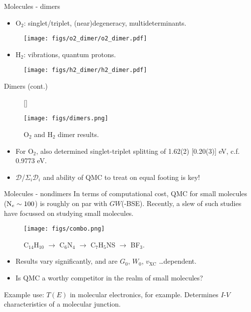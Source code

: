 \documentclass[12pt, pdf, hyperref={draft}, usenames, dvipsnames]{beamer}
\begin{document}
\begin{frame}{Molecules - dimers}
\begin{itemize}
  \item O$_2$: singlet/triplet, (near)degeneracy, multideterminants.
\end{itemize}
\begin{figure}[H]
  \centering
  \texttt{[image: figs/o2\_dimer/o2\_dimer.pdf]}
\end{figure}
\vfill
\begin{itemize}
  \item H$_2$: vibrations, quantum protons.
\end{itemize}
\begin{figure}[H]
  \centering
  \texttt{[image: figs/h2\_dimer/h2\_dimer.pdf]}
\end{figure}
\end{frame}

\begin{frame}{Dimers (cont.)}
\begin{figure}[H]
  [\FBwidth]
  {\caption{O$_2$ and H$_2$ dimer results.}\label{fig:dimers}}
  {\texttt{[image: figs/dimers.png]}}
\end{figure}

\begin{itemize}
  \item For O$_2$, also determined singlet-triplet splitting of 1.62(2)
  [0.20(3)] eV, c.f.
  0.9773 eV.
  \item $\mathcal{D}$/$\Sigma_i\mathcal{D}_i$ and ability of QMC
  to treat on equal footing is key!
\end{itemize}
\end{frame}

\begin{frame}{Molecules - nondimers}
In terms of computational cost, QMC for small molecules (${\rm N}_e \sim 100$) is roughly on par with
$GW$(-BSE). Recently, a slew of such studies have focussed on studying small
molecules.
\begin{figure}[H]
  \centering
  \texttt{[image: figs/combo.png]}
  \caption{C$_{14}$H$_{10}$ $\rightarrow$ C$_6$N$_4$ $\rightarrow$ C$_7$H$_5$NS
  $\rightarrow$ BF$_3$.}
\label{fig:combo}
\end{figure}
\begin{itemize}
  \item Results vary significantly, and are $G_0$, $W_0$, $v_{\text{XC}}$
  \ldots dependent.
  \item Is QMC a worthy competitor in the realm of small molecules?
\end{itemize}
Example use: $T(E)$ in molecular electronics, for example. Determines $I$-$V$
characteristics of a molecular junction.
\end{frame}
\end{document}
